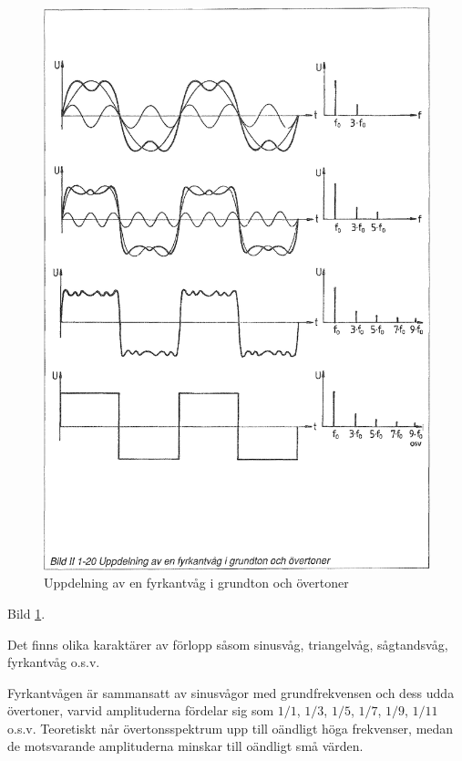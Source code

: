 \begin{figure}
\begin{center}
\includegraphics[width=14cm]{images/bild_2_1-20}
\caption{Uppdelning av en fyrkantvåg i grundton och övertoner}
\label{fig:BildII1-20}
\end{center}
\end{figure}

Bild \ref{fig:BildII1-20}.

Det finns olika karaktärer av förlopp såsom sinusvåg, triangelvåg, sågtandsvåg,
fyrkantvåg o.s.v.

Fyrkantvågen är sammansatt av sinusvågor med grundfrekvensen och dess udda
övertoner, varvid amplituderna fördelar sig som \(1/1\), \(1/3\), \(1/5\),
\(1/7\), \(1/9\), \(1/11\) o.s.v. Teoretiskt når övertonsspektrum upp till
oändligt höga frekvenser, medan de motsvarande amplituderna minskar till
oändligt små värden.

